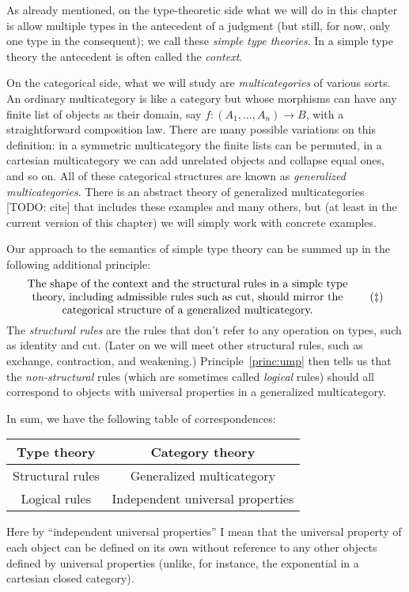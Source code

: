 \documentclass{book}
\begin{document}
As already mentioned, on the type-theoretic side what we will do in this chapter is allow multiple types in the antecedent of a judgment (but still, for now, only one type in the consequent); we call these \emph{simple type theories}.
In a simple type theory the antecedent is often called the \emph{context}.

On the categorical side, what we will study are \emph{multicategories} of various sorts.
An ordinary multicategory is like a category but whose morphisms can have any finite list of objects as their domain, say $f:(A_1,\dots,A_n) \to B$, with a straightforward composition law.
There are many possible variations on this definition: in a symmetric multicategory the finite lists can be permuted, in a cartesian multicategory we can add unrelated objects and collapse equal ones, and so on.
All of these categorical structures are known as \emph{generalized multicategories}.
There is an abstract theory of generalized multicategories [TODO: cite] that includes these examples and many others, but (at least in the current version of this chapter) we will simply work with concrete examples.

Our approach to the semantics of simple type theory can be summed up in the following additional principle:
\begin{equation}\label{princ:structural}
  \parbox{4in}{\centering The shape of the context and the structural rules in a simple type theory, including admissible rules such as cut, should mirror the categorical structure of a generalized multicategory.}\tag{$\ddagger$}
\end{equation}
The \emph{structural rules} are the rules that don't refer to any operation on types, such as identity and cut.
(Later on we will meet other structural rules, such as exchange, contraction, and weakening.)
Principle~\eqref{princ:ump} then tells us that the \emph{non-structural} rules (which are sometimes called \emph{logical} rules) should all correspond to objects with universal properties in a generalized multicategory.

In sum, we have the following table of correspondences:
\begin{center}
  \begin{tabular}{c|c}
    Type theory & Category theory\\\hline
    Structural rules & Generalized multicategory\\
    Logical rules & Independent universal properties
  \end{tabular}
\end{center}
Here by ``independent universal properties'' I mean that the universal property of each object can be defined on its own without reference to any other objects defined by universal properties (unlike, for instance, the exponential in a cartesian closed category).
\end{document}
